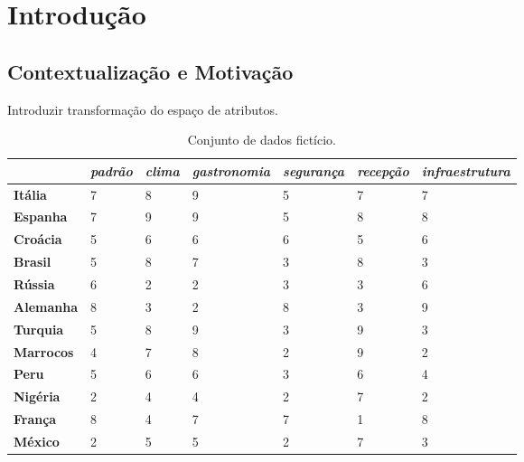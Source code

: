 \chapter{Introdução}

\section{Contextualização e Motivação}




Introduzir transformação do espaço de atributos.


\begin{table}[htbp]
    \caption{Conjunto de dados fictício.}
    \begin{center}
        \begin{tabular}{|l|C{1.5cm}|C{1.5cm}|C{1.5cm}|C{1.5cm}|C{1.5cm}|C{1.5cm}|}
             & 
            \textbf{\textit{padrão}} & 
            \textbf{\textit{clima}} & 
            \textbf{\textit{gastronomia}} & 
            \textbf{\textit{segurança}} & 
            \textbf{\textit{recepção}} & 
            \textbf{\textit{infraestrutura}} \\ \hline
            \textbf{Itália} & 7 & 8 & 9 & 5 & 7 & 7 \\ \hline
            \textbf{Espanha} & 7 & 9 & 9 & 5 & 8 & 8 \\ \hline
            \textbf{Croácia} & 5 & 6 & 6 & 6 & 5 & 6 \\ \hline
            \textbf{Brasil} & 5 & 8 & 7 & 3 & 8 & 3 \\ \hline
            \textbf{Rússia} & 6 & 2 & 2 & 3 & 3 & 6 \\ \hline
            \textbf{Alemanha} & 8 & 3 & 2 & 8 & 3 & 9 \\ \hline
            \textbf{Turquia} & 5 & 8 & 9 & 3 & 9 & 3 \\ \hline
            \textbf{Marrocos} & 4 & 7 & 8 & 2 & 9 & 2 \\ \hline
            \textbf{Peru} & 5 & 6 & 6 & 3 & 6 & 4 \\ \hline
            \textbf{Nigéria} & 2 & 4 & 4 & 2 & 7 & 2 \\ \hline
            \textbf{França} & 8 & 4 & 7 & 7 & 1 & 8 \\ \hline
            \textbf{México} & 2 & 5 & 5 & 2 & 7 & 3 \\ \hline
        \end{tabular}
    \end{center}
    \label{tab:at}
\end{table}


